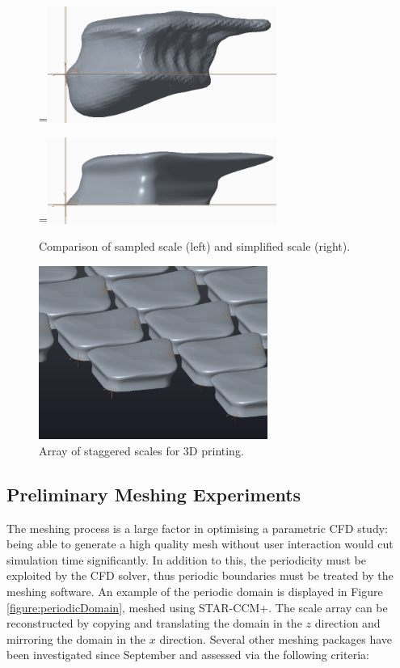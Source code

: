 \documentclass[12pt,oneside,a4paper]{article}
\newcommand*{\vcenteredhbox}[1]{\begingroup
\setbox0=\hbox{#1}\parbox{\wd0}{\box0}\endgroup}
\begin{document}
\begin{figure}[!t]
\\
\vspace{3cm}
\vcenteredhbox{\includegraphics[width=7.5cm]{images/Scale_Replication_14.PNG}}\hfill
\vcenteredhbox{\includegraphics[width=7.5cm]{images/Scale_Replication_13.PNG}}
\caption{Comparison of sampled scale (left) and simplified scale (right).}
\label{figure:scaleComparison}
\end{figure}

\begin{figure}[!t]
\centering
\includegraphics[width=7.5cm]{images/array_progress_report.PNG}
\caption{Array of staggered scales for 3D printing.}
\label{figure:staggeredArray}
\end{figure}




\newpage
\subsection{Preliminary Meshing Experiments}
\label{section:meshing}
The meshing process is a large factor in optimising a parametric CFD study: being able to generate a high quality mesh without user interaction would cut simulation time significantly. In addition to this, the periodicity must be exploited by the CFD solver, thus periodic boundaries must be treated by the meshing software. An example of the periodic domain is displayed in Figure \ref{figure:periodicDomain}, meshed using STAR-CCM+. The scale array can be reconstructed by copying and translating the domain in the $z$ direction and mirroring the domain in the $x$ direction. Several other meshing packages have been investigated since September and assessed via the following criteria:
\end{document}
